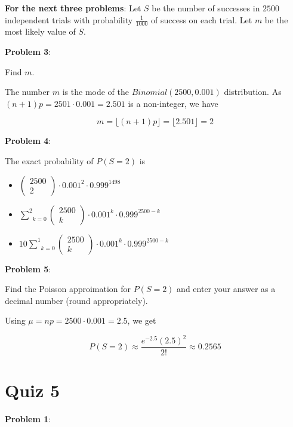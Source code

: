 \documentclass{article}
\begin{document}
\noindent\textbf{For the next three problems}: Let $S$ be the number of successes in $2500$ independent trials with probability $\frac{1}{1000}$ of success on each trial. Let $m$ be the most likely value of $S$.

\noindent\textbf{Problem 3}: 

Find $m$.

{\color{blue}

The number $m$ is the mode of the $Binomial(2500, 0.001)$ distribution. As $(n+1)p=2501\cdot0.001=2.501$ is a non-integer, we have

\[m=\lfloor(n+1)p\rfloor=\lfloor2.501\rfloor=2\]

}

\noindent\textbf{Problem 4}:

The exact probability of $P(S=2)$ is 

\begin{itemize}
    \item {\color{blue}$\begin{pmatrix}2500\\2\end{pmatrix}\cdot0.001^2\cdot0.999^{1498}$}
    \item $\underset{k=0}{\overset{2}{\sum}}\begin{pmatrix}2500\\k\end{pmatrix}\cdot0.001^k\cdot0.999^{2500-k}$
    \item $10\underset{k=0}{\overset{1}{\sum}}\begin{pmatrix}2500\\k\end{pmatrix}\cdot0.001^k\cdot0.999^{2500-k}$
\end{itemize}

\noindent\textbf{Problem 5}:

Find the Poisson approimation for $P(S=2)$ and enter your answer as a decimal number (round appropriately).

{\color{blue}

Using $\mu=np=2500\cdot0.001=2.5$, we get

\[P(S=2)\approx\frac{e^{-2.5}(2.5)^2}{2!}\approx0.2565\]

}

\section{Quiz 5}

\noindent\textbf{Problem 1}:
\end{document}
